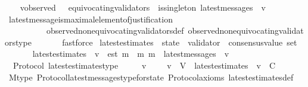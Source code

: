 \begin{isabellebody}
\ \isamarkupfalse%
\ {\isachardoublequoteopen}{\isasymforall}{\isasymsigma}{\isasymin}{\isasymSigma}{\isachardot}\ {\isasymforall}v{\isasymin}observed\ {\isasymsigma}\ {\isacharminus}\ equivocating{\isacharunderscore}validators\ {\isasymsigma}{\isachardot}\ is{\isacharunderscore}singleton\ {\isacharparenleft}latest{\isacharunderscore}messages\ {\isasymsigma}\ v{\isacharparenright}{\isachardoublequoteclose}\ \ \isanewline
\ \ \ \ \isamarkupfalse%
\ latest{\isacharunderscore}message{\isacharunderscore}is{\isacharunderscore}maximal{\isacharunderscore}element{\isacharunderscore}of{\isacharunderscore}justification\isanewline
\ \ \ \ \ \ \ \ \ \ observed{\isacharunderscore}non{\isacharunderscore}equivocating{\isacharunderscore}validators{\isacharunderscore}def\ observed{\isacharunderscore}non{\isacharunderscore}equivocating{\isacharunderscore}validators{\isacharunderscore}type\ \isanewline
\ \ \ \ \isamarkupfalse%
\ fastforce\isanewline
{}\isamarkupfalse%
%
\endisatagproof
{\isafoldproof}%
%
\isadelimproof
\isanewline
%
\endisadelimproof
\isanewline
\isanewline
\isanewline
\isanewline
\isanewline
\isanewline
\isanewline
{}\isamarkupfalse%
\ latest{\isacharunderscore}estimates\ {\isacharcolon}{\isacharcolon}\ {\isachardoublequoteopen}state\ {\isasymRightarrow}\ validator\ {\isasymRightarrow}\ consensus{\isacharunderscore}value\ set{\isachardoublequoteclose}\isanewline
\ \ \isanewline
\ \ \ \ {\isachardoublequoteopen}latest{\isacharunderscore}estimates\ {\isasymsigma}\ v\ {\isacharequal}\ {\isacharbraceleft}est\ m\ {\isacharbar}\ m{\isachardot}\ m\ {\isasymin}\ latest{\isacharunderscore}messages\ {\isasymsigma}\ v{\isacharbraceright}{\isachardoublequoteclose}\isanewline
\isanewline
{}\isamarkupfalse%
\ {\isacharparenleft}\ Protocol{\isacharparenright}\ latest{\isacharunderscore}estimates{\isacharunderscore}type\ {\isacharcolon}\isanewline
\ \ {\isachardoublequoteopen}{\isasymforall}\ {\isasymsigma}\ v{\isachardot}\ {\isasymsigma}\ {\isasymin}\ {\isasymSigma}\ {\isasymand}\ v\ {\isasymin}\ V\ {\isasymlongrightarrow}\ latest{\isacharunderscore}estimates\ {\isasymsigma}\ v\ {\isasymsubseteq}\ C{\isachardoublequoteclose}\isanewline
%
\isadelimproof
\ \ %
\endisadelimproof
%
\isatagproof
{}\isamarkupfalse%
\ M{\isacharunderscore}type\ Protocol{\isachardot}latest{\isacharunderscore}messages{\isacharunderscore}type{\isacharunderscore}for{\isacharunderscore}state\ Protocol{\isacharunderscore}axioms\ latest{\isacharunderscore}estimates{\isacharunderscore}def\ \isamarkupfalse%

\end{isabellebody}
